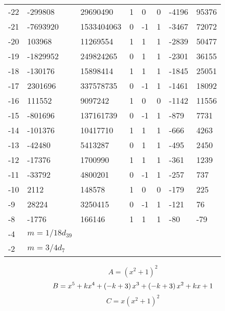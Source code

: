 \documentclass{amsart}
\begin{document}
\begin{longtable}{|l|l|l|lllll|}
-22&-299808&29690490&1&0&0&-4196&95376\\
-21&-7693920&1533404063&0&-1&1&-3467&72072\\
-20&103968&11269554&1&1&1&-2839&50477\\
-19&-1829952&249824265&0&1&1&-2301&36155\\
-18&-130176&15898414&1&1&1&-1845&25051\\
-17&2301696&337578735&0&-1&1&-1461&18092\\
-16&111552&9097242&1&0&0&-1142&11556\\
-15&-801696&137161739&0&-1&1&-879&7731\\
-14&-101376&10417710&1&1&1&-666&4263\\
-13&-42480&5413287&0&1&1&-495&2450\\
-12&-17376&1700990&1&1&1&-361&1239\\
-11&-33792&4800201&0&-1&1&-257&737\\
-10&2112&148578&1&0&0&-179&225\\
-9&28224&3250415&0&-1&1&-121&76\\
-8&-1776&166146&1&1&1&-80&-79\\
-4&$m=1/18d_{39}$&&\multicolumn{5}{c|}{}\\
-2&$m=3/4d_{7}$&&\multicolumn{5}{c|}{}\\
\hline
\end{longtable}
$$A=(x^2
 + 1)^{2}$$
$$B=x^5
 + k\*x^4
 + \left(-k
 + 3\right) \*x^3
 + \left(-k
 + 3\right) \*x^2
 + k\*x
 + 1$$
$$C=x(x^2
 + 1)^{2}$$
\end{document}
